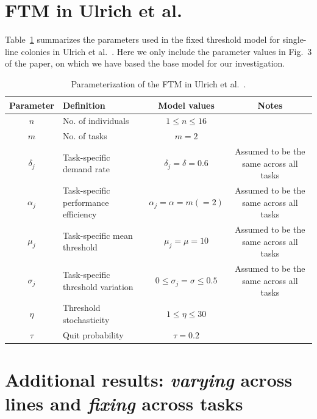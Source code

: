 \documentclass[11pt]{article}
\begin{document}
\newpage
\begin{appendices}

\section{FTM in Ulrich et al.} \label{sec:original}
Table~\ref{tab:original} summarizes the parameters used in the fixed threshold model for single-line colonies in Ulrich et al.~\cite{ulrich2018}.  Here we only include the parameter values in Fig.~3 of the paper, on which we have based the base model for our investigation.

\begin{table}[H] \small
  \begin{center}
    \begin{tabular}{|c|>{\centering}p{2.05in}|c|c|} 
      \hline
      \textbf{Parameter} & \textbf{Definition} & \textbf{Model values} & \textbf{Notes} \\ \hline
      $n$ & No. of individuals & $1\leq n \leq16$ & \\ \hline
      $m$ & No. of tasks & $m = 2$ & \\ \hline
      $\delta_j$ & Task-specific demand rate & $\delta_j = \delta = 0.6$ & Assumed to be the same across all tasks \\ \hline
      $\alpha_j$ & Task-specific performance efficiency & $\alpha_j = \alpha = m(=2) $ & Assumed to be the same across all tasks \\ \hline
      $\mu_j$ & Task-specific mean threshold & $\mu_j = \mu = 10$ & Assumed to be the same across all tasks \\ \hline
      $\sigma_j$ & Task-specific threshold variation & $0 \leq \sigma_j = \sigma \leq 0.5$ & Assumed to be the same across all tasks \\ \hline
      $\eta$ & Threshold stochasticity & $1 \leq \eta \leq 30 $ & \\ \hline
      $\tau$ & Quit probability & $\tau = 0.2$ & \\ \hline
    \end{tabular}
    \caption{Parameterization of the FTM in Ulrich et al.~\cite{ulrich2018}.}
    \label{tab:original}
  \end{center}
\end{table}


\section{Additional results: \textit{varying} across lines and \textit{fixing} across tasks}


\end{appendices}
\end{document}
